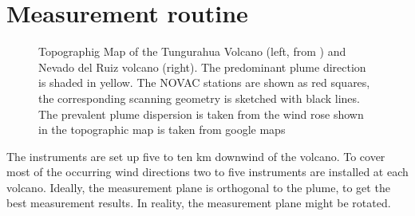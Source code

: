 		\section{Measurement routine}
		\begin{figure}[h]
			\hspace*{-0.8cm}
			\caption{Topographig Map of the Tungurahua Volcano (left, from \cite{hidalgo2015so2}) and Nevado del Ruiz volcano (right). The predominant plume direction is shaded in yellow.  The NOVAC stations are shown as red squares, the corresponding scanning geometry is sketched with black lines. The prevalent plume dispersion is taken from the wind rose shown in \citet{Windrose} the topographic map is taken from google maps}
		\label{fig:maptungurahua2}
	\end{figure}
	
		The instruments are set up five to ten km downwind of the volcano. To cover most of the occurring wind directions two to five instruments are installed at each volcano. Ideally, the measurement plane is orthogonal to the plume, to get the best measurement results. In reality, the measurement plane might be rotated.\\
		
